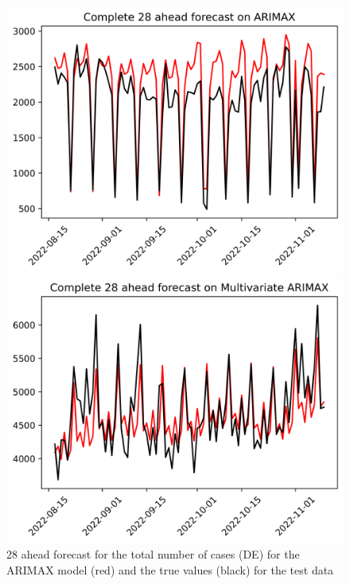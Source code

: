 \begin{figure}

\begin{minipage}{.32\textwidth}
  \centering
  \includegraphics[width=\linewidth]{pics/28_ah/DE_Complete_28_ahead_ARIMAX.png}
  \caption{28 ahead forecast for the total number of cases (DE) for the ARIMAX model (red) and the true values (black) for the test data}
  \label{fig:tot_cases_fc_28_ARIMAX_DE}
\end{minipage}
\begin{minipage}{.32\textwidth}
  \centering
  \includegraphics[width=\linewidth]{pics/28_ah/Complete_28_ahead_Multivariate ARIMAX.png}

\end{minipage}
\end{figure}
